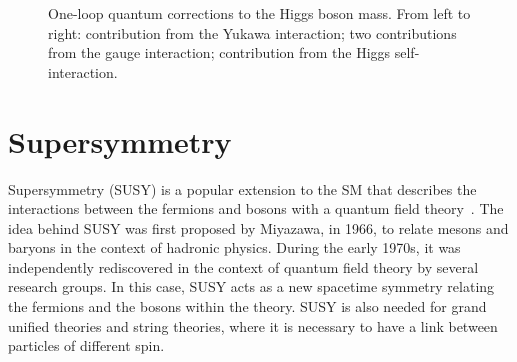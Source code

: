 \begin{figure}[t]
  \hfill
  \hfill
  \hfill
  \caption{One-loop quantum corrections to the Higgs boson mass.
    From left to right: contribution
    from the Yukawa interaction; two contributions from the gauge interaction;
    contribution from the Higgs self-interaction.
  }
  \label{fig:oneloopdiagrams}
\end{figure}

\FloatBarrier
\section{Supersymmetry}
\label{sec:susy}

Supersymmetry (SUSY) is a popular extension to the SM that describes the
interactions between the fermions and bosons with a quantum field
theory~\cite{Miyazawa:1966,PhysRev.170.1586,Volkov:1972jx,Volkov:1973ix,
  Volkov:1973jd,Ramond:1971gb,Golfand:1971iw,Neveu:1971rx,Neveu:1971iv,
  Gervais:1971ji,Wess:1973kz,Wess:1974tw}.
The idea behind SUSY was first proposed by Miyazawa, in 1966, to relate
mesons and baryons in the context of hadronic
physics.
During the early 1970s, it was independently rediscovered in the context of
quantum field theory by several research groups.
In this case, SUSY acts as a new spacetime symmetry relating the fermions and
the bosons within the theory.
SUSY is also needed for grand unified theories and string theories, where it is
necessary to have a link between particles of different spin.

